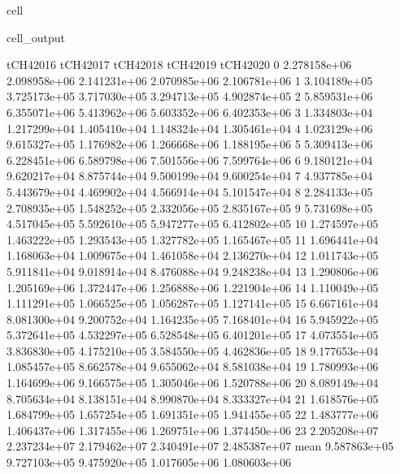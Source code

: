 \documentclass[letterpaper,10pt,english]{jupyterBook}
\begin{document}
\begin{sphinxuseclass}{cell}
\begin{sphinxVerbatimOutput}
\begin{sphinxuseclass}{cell_output}
\begin{sphinxVerbatim}[commandchars=\\\{\}]
         tCH4\PYGZus{}2016     tCH4\PYGZus{}2017     tCH4\PYGZus{}2018     tCH4\PYGZus{}2019     tCH4\PYGZus{}2020  \PYGZbs{}
0     2.278158e+06  2.098958e+06  2.141231e+06  2.070985e+06  2.106781e+06   
1     3.104189e+05  3.725173e+05  3.717030e+05  3.294713e+05  4.902874e+05   
2     5.859531e+06  6.355071e+06  5.413962e+06  5.603352e+06  6.402353e+06   
3     1.334803e+04  1.217299e+04  1.405410e+04  1.148324e+04  1.305461e+04   
4     1.023129e+06  9.615327e+05  1.176982e+06  1.266668e+06  1.188195e+06   
5     5.309413e+06  6.228451e+06  6.589798e+06  7.501556e+06  7.599764e+06   
6     9.180121e+04  9.620217e+04  8.875744e+04  9.500199e+04  9.600254e+04   
7     4.937785e+04  5.443679e+04  4.469902e+04  4.566914e+04  5.101547e+04   
8     2.284133e+05  2.708935e+05  1.548252e+05  2.332056e+05  2.835167e+05   
9     5.731698e+05  4.517045e+05  5.592610e+05  5.947277e+05  6.412802e+05   
10    1.274597e+05  1.463222e+05  1.293543e+05  1.327782e+05  1.165467e+05   
11    1.696441e+04  1.168063e+04  1.009675e+04  1.461058e+04  2.136270e+04   
12    1.011743e+05  5.911841e+04  9.018914e+04  8.476088e+04  9.248238e+04   
13    1.290806e+06  1.205169e+06  1.372447e+06  1.256888e+06  1.221904e+06   
14    1.110049e+05  1.111291e+05  1.066525e+05  1.056287e+05  1.127141e+05   
15    6.667161e+04  8.081300e+04  9.200752e+04  1.164235e+05  7.168401e+04   
16    5.945922e+05  5.372641e+05  4.532297e+05  6.528548e+05  6.401201e+05   
17    4.073554e+05  3.836830e+05  4.175210e+05  3.584550e+05  4.462836e+05   
18    9.177653e+04  1.085457e+05  8.662578e+04  9.655062e+04  8.581038e+04   
19    1.780993e+06  1.164699e+06  9.166575e+05  1.305046e+06  1.520788e+06   
20    8.089149e+04  8.705634e+04  8.138151e+04  8.990870e+04  8.333327e+04   
21    1.618576e+05  1.684799e+05  1.657254e+05  1.691351e+05  1.941455e+05   
22    1.483777e+06  1.406437e+06  1.317455e+06  1.269751e+06  1.374450e+06   
23    2.205208e+07  2.237234e+07  2.179462e+07  2.340491e+07  2.485387e+07   
mean  9.587863e+05  9.727103e+05  9.475920e+05  1.017605e+06  1.080603e+06   


\end{sphinxVerbatim}
\end{sphinxuseclass}
\end{sphinxVerbatimOutput}
\end{sphinxuseclass}
\end{document}
